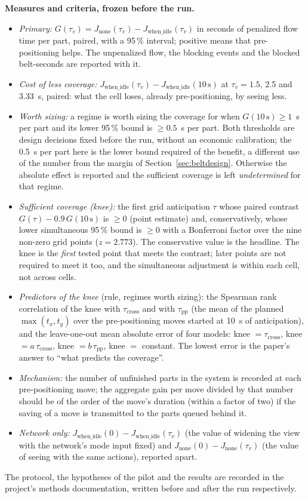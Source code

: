 \documentclass[11pt,a4paper]{article}
\newcommand{\tcross}{\tau_{\mathrm{cross}}}
\newcommand{\tpp}{\tau_{\mathrm{pp}}}
\newcommand{\tv}{\tau_{v}}
\begin{document}
\textbf{Measures and criteria, frozen before the run.}
\begin{itemize}[nosep]
\item \emph{Primary:} $G(\tv)=J_{\mathrm{none}}(\tv)-J_{\mathrm{when\_idle}}(\tv)$ in
  seconds of penalized flow time per part, paired, with a 95\,\% interval; positive means
  that pre-positioning helps. The unpenalized flow, the blocking events and the blocked
  belt-seconds are reported with it.
\item \emph{Cost of less coverage:} $J_{\mathrm{when\_idle}}(\tv)-J_{\mathrm{when\_idle}}(10\,\mathrm{s})$
  at $\tv=1.5$, 2.5 and 3.33~s, paired: what the cell loses, already pre-positioning, by
  seeing less.
\item \emph{Worth sizing:} a regime is worth sizing the coverage for when
  $G(10\,\mathrm{s})\ge1$~s per part and its lower 95\,\% bound is $\ge0.5$~s per part.
  Both thresholds are design decisions fixed before the run, without an economic
  calibration; the 0.5~s per part here is the lower bound required of the benefit, a
  different use of the number from the margin of Section~\ref{sec:beltdesign}.
  Otherwise the absolute effect is reported and the sufficient coverage is left
  \emph{undetermined} for that regime.
\item \emph{Sufficient coverage (knee):} the first grid anticipation $\tau$ whose paired
  contrast $G(\tau)-0.9\,G(10\,\mathrm{s})$ is $\ge0$ (point estimate) and, conservatively,
  whose lower simultaneous 95\,\% bound is $\ge0$ with a Bonferroni factor over the nine
  non-zero grid points ($z=2.773$). The conservative value is the headline. The knee is the
  \emph{first} tested point that meets the contrast; later points are not required to meet
  it too, and the simultaneous adjustment is within each cell, not across cells.
\item \emph{Predictors of the knee} (rule, regimes worth sizing): the Spearman rank
  correlation of the knee with $\tcross$ and with $\tpp$ (the mean of the planned
  $\max(t_x,t_y)$ over the pre-positioning moves started at 10~s of anticipation), and the leave-one-out mean
  absolute error of four models: knee $=\tcross$, knee $=a\,\tcross$, knee $=b\,\tpp$,
  knee $=$ constant. The lowest error is the paper's answer to ``what predicts the
  coverage''.
\item \emph{Mechanism:} the number of unfinished parts in the system is recorded at each
  pre-positioning move; the aggregate gain per move divided by that number should be of
  the order of the move's duration (within a factor of two) if the saving of a move is
  transmitted to the parts queued behind it.
\item \emph{Network only:} $J_{\mathrm{when\_idle}}(0)-J_{\mathrm{when\_idle}}(\tv)$ (the
  value of widening the view with the network's mode input fixed) and
  $J_{\mathrm{none}}(0)-J_{\mathrm{none}}(\tv)$ (the value of seeing with the same actions),
  reported apart.
\end{itemize}
The protocol, the hypotheses of the pilot and the results are recorded in the project's
methods documentation, written before and after the run respectively.
\end{document}
